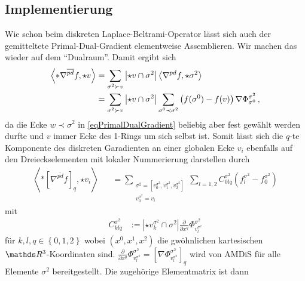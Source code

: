   \subsection{Implementierung}
    Wie schon beim diskreten Laplace-Beltrami-Operator lässt sich auch der gemitteltete Primal-Dual-Gradient elementweise Assemblieren.
    Wir machen das wieder auf dem "`Dualraum"'. 
    Damit ergibt sich
    \begin{align}
      \left\langle *\nabla^{\overline{pd}} f, \star v \right\rangle
        &= \sum_{\sigma^{2}\succ v} \left| \star v \cap \sigma^{2} \right| 
                  \left\langle \nabla^{pd} f , \star\sigma^{2} \right\rangle \\
        &= \sum_{\sigma^{2}\succ v} \left| \star v \cap \sigma^{2} \right|
                 \sum_{\sigma^{0}\prec\sigma^{2}} \left( f(\sigma^{0}) - f(v) \right) \nabla\Phi_{\sigma^{0}}^{\sigma^{2}} \,\text{,}
    \end{align}
    da die Ecke \( w \prec \sigma^{2} \) in \eqref{eqPrimalDualGradient} beliebig aber fest gewählt werden durfte 
    und \( v \) immer Ecke des 1-Rings um sich selbst ist.
    Somit lässt sich die \( q \)-te Komponente des diskreten Garadienten an einer globalen Ecke \( v_{i} \) 
    ebenfalls auf den Dreieckselementen mit lokaler Nummerierung
    darstellen durch
    \begin{align}
      \left\langle *\left[ \nabla^{\overline{pd}} f \right]_{q}, \star v_{i} \right\rangle
          &&= \sum_{\substack{\sigma^{2}=\left[ v^{\sigma^{2}}_{0},v^{\sigma^{2}}_{1},v^{\sigma^{2}}_{2} \right]\\
                                               v^{\sigma^{2}}_{0} = v_{i}}}
                  \sum_{l=1,2} C^{\sigma^{2}}_{0lq} 
                      \left( f_{l}^{\sigma^{2}} - f_{0}^{\sigma^{2}}\right)
    \end{align}
    mit
    \begin{align}
      C^{\sigma^{2}}_{klq} &:= \left| \star v_{k}^{\sigma^{2}} \cap \sigma^{2} \right|
                               \frac{\partial}{\partial x^{q}} \Phi^{\sigma^{2}}_{v_{l}^{\sigma^{2}}}
    \end{align}
    für \( k,l,q\in\left\{ 0,1,2 \right\} \) wobei \( \left( x^{0}, x^{1}, x^{2} \right) \) die gwöhnlichen kartesischen \( \R^{3} \)-Koordinaten sind.
    \( \frac{\partial}{\partial x^{q}}\Phi^{\sigma^{2}}_{v_{l}^{\sigma^{2}}} = \left[ \nabla \Phi^{\sigma^{2}}_{v_{l}^{\sigma^{2}}} \right]_{q} \)
    wird von AMDiS für alle Elemente \( \sigma^{2} \) bereitgestellt.
    Die zugehörige Elementmatrix ist dann
